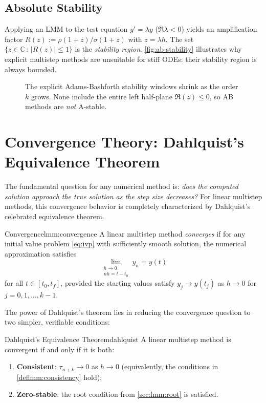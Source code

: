 \subsection{Absolute Stability}
Applying an LMM to the test equation $y'=\lambda y$ ($\Re\lambda<0$) yields an amplification factor $R(z):=\rho(1+z)/\sigma(1+z)$ with $z=\lambda h$.
The set $\{z\in\mathbb{C}\,:\,|R(z)|\le1\}$ is the \emph{stability region}.
\autoref{fig:ab-stability} illustrates why explicit multistep methods are unsuitable for stiff ODEs: their stability region is always bounded.

\begin{figure}[htbp]
  \centering
  
  \caption{The explicit Adams-Bashforth stability windows shrink as the
    order~$k$ grows.  None include the entire left half-plane
    $\Re(z)\le0$, so AB methods are \emph{not} A-stable.}
  \label{fig:ab-stability}
\end{figure}


\section{Convergence Theory: Dahlquist's Equivalence Theorem}
\label{sec:lmm:convergence}

The fundamental question for any numerical method is: \emph{does the computed solution approach the true solution as the step size decreases?} For linear multistep methods, this convergence behavior is completely characterized by Dahlquist's celebrated equivalence theorem.

\begin{definition}{Convergence}{lmm:convergence}
  A linear multistep method \emph{converges} if for any initial value problem \eqref{eq:ivp} with sufficiently smooth solution, the numerical approximation satisfies
  \[
    \lim_{\substack{h \to 0 \\ nh = t - t_0}} y_n = y(t)
  \]
  for all $t \in [t_0, t_f]$, provided the starting values satisfy $y_j \to y(t_j)$ as $h \to 0$ for $j = 0, 1, \ldots, k-1$.
\end{definition}

The power of Dahlquist's theorem lies in reducing the convergence question to two simpler, verifiable conditions:

\begin{theorem}{Dahlquist's Equivalence Theorem}{dahlquist}
  A linear multistep method is convergent if and only if it is both:
  \begin{enumerate}
    \item \textbf{Consistent}: $\tau_{n+k} \to 0$ as $h \to 0$ (equivalently, the conditions in \ref{deflmm:consistency} hold);
    \item \textbf{Zero-stable}: the root condition from \autoref{sec:lmm:root} is satisfied.
  \end{enumerate}
\end{theorem}

